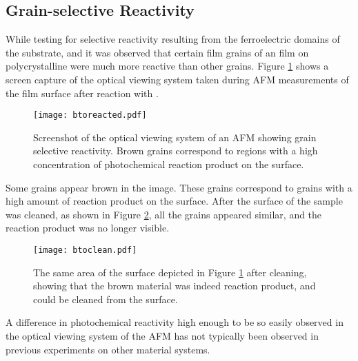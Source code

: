 \subsection{Grain-selective Reactivity}
\label{subsec:ch6grain}


While testing for selective reactivity resulting from the ferroelectric domains of the substrate, and it was observed that certain film grains of an  film on polycrystalline  were much more reactive than other grains. Figure \ref{fig:btoreacted} shows a screen capture of the optical viewing system taken during AFM measurements of the film surface after reaction with .
\begin{figure}[htbp]
\begin{center}
\texttt{[image: btoreacted.pdf]}
\caption[Optical image showing grain selective reactivity]{Screenshot of the optical viewing system of an AFM showing grain selective reactivity. Brown grains correspond to regions with a high concentration of photochemical reaction product on the surface.}
\label{fig:btoreacted} %
\end{center}
\end{figure}
Some grains appear brown in the image. These grains correspond to grains with a high amount of reaction product on the surface. After the surface of the sample was cleaned, as shown in Figure \ref{fig:btoclean}, all the grains appeared similar, and the reaction product was no longer visible.
\begin{figure}[htbp]
\begin{center}
\texttt{[image: btoclean.pdf]}
\caption[Area of the surface depicted in Figure \ref{fig:btoreacted} after cleaning]{The same area of the surface depicted in Figure \ref{fig:btoreacted} after cleaning, showing that the brown material was indeed reaction product, and could be cleaned from the surface.}
\label{fig:btoclean} %
\end{center}
\end{figure}
A difference in photochemical reactivity high enough to be so easily observed in the optical viewing system of the AFM has not typically been observed in previous experiments on other material systems.

